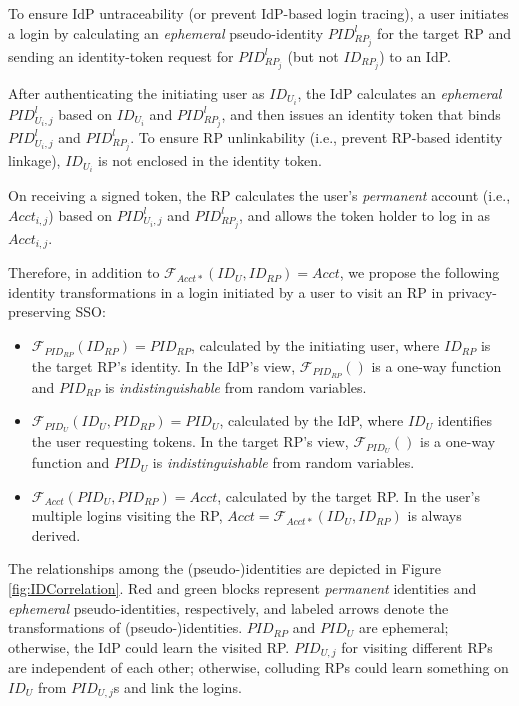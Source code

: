 To ensure IdP untraceability (or prevent IdP-based login tracing),
    a user initiates a login by calculating an \emph{ephemeral} pseudo-identity $PID^l_{RP_j}$  for the target RP and sending an identity-token request for $PID^l_{RP_j}$ (but not $ID_{RP_j}$) to an IdP.

After authenticating the initiating user as $ID_{U_i}$, the IdP calculates an \emph{ephemeral} $PID^l_{U_i,j}$ based on $ID_{U_i}$ and $PID^l_{RP_j}$, and then issues an identity token that binds $PID^l_{U_i,j}$ and $PID^l_{RP_j}$.
To ensure RP unlinkability (i.e., prevent RP-based identity linkage),
    $ID_{U_i}$ is not enclosed in the identity token.

On receiving a signed token, the RP calculates the user's \emph{permanent} account (i.e., $Acct_{i,j}$) based on $PID^l_{U_i,j}$ and $PID^l_{RP_j}$,
and allows the token holder to log in as $Acct_{i,j}$.

Therefore, in addition to $\mathcal{F}_{Acct\ast}(ID_{U}, ID_{RP}) = Acct$,
we propose the following identity transformations in a login initiated by a user to visit an RP in privacy-preserving SSO:
\begin{itemize}
\setlength{\topsep}{0pt}
\setlength{\partopsep}{0pt}
\setlength{\itemsep}{0pt}
\setlength{\parsep}{0pt}
\setlength{\parskip}{0pt}

\item
$\mathcal{F}_{PID_{RP}}(ID_{RP}) = PID_{RP}$, calculated by the initiating user,
    where $ID_{RP}$ is the target RP's identity.
In the IdP's view,
$\mathcal{F}_{PID_{RP}}()$ is a one-way function and $PID_{RP}$
is \emph{indistinguishable} from random variables.
\item
$\mathcal{F}_{PID_U}(ID_U, PID_{RP}) = PID_{U}$, calculated by the IdP,
    where $ID_U$ identifies the user requesting tokens.
In the target RP's view,
    $\mathcal{F}_{PID_U}()$ is a one-way function and $PID_{U}$ is \emph{indistinguishable} from random variables.
\item
$\mathcal{F}_{Acct}(PID_{U}, PID_{RP}) = Acct$, calculated by the target RP.
In the user's multiple logins visiting the RP,
    $Acct = \mathcal{F}_{Acct\ast}(ID_{U}, ID_{RP})$ is always derived.
\end{itemize}

The relationships among the (pseudo-)identities are depicted in Figure \ref{fig:IDCorrelation}.
Red and green blocks represent \emph{permanent} identities and \emph{ephemeral} pseudo-identities, respectively, and 
labeled arrows denote the transformations of (pseudo-)identities.
$PID_{RP}$ and $PID_{U}$ are ephemeral;
    otherwise, the IdP could learn the visited RP.
$PID_{U,j}$ for visiting different RPs are independent of each other;
    otherwise, colluding RPs could learn something on $ID_U$ from $PID_{U,j}$s and link the logins.

